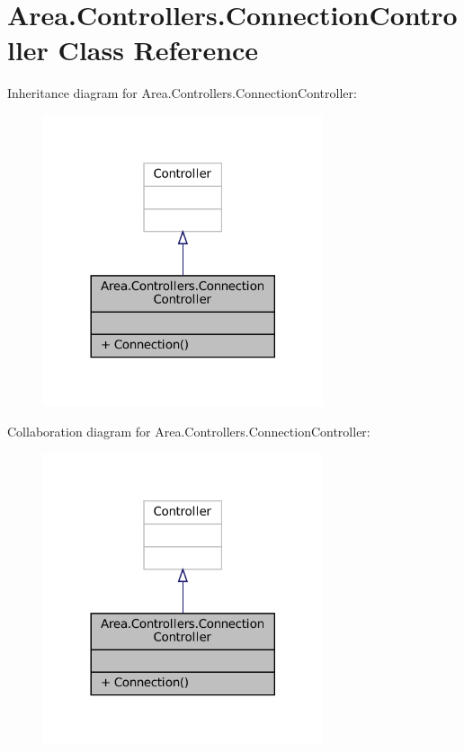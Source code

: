 \hypertarget{classArea_1_1Controllers_1_1ConnectionController}{}\section{Area.\+Controllers.\+Connection\+Controller Class Reference}
\label{classArea_1_1Controllers_1_1ConnectionController}


Inheritance diagram for Area.\+Controllers.\+Connection\+Controller\+:
\nopagebreak
\begin{figure}[H]
\begin{center}
\leavevmode
\includegraphics[width=233pt]{classArea_1_1Controllers_1_1ConnectionController__inherit__graph}
\end{center}
\end{figure}


Collaboration diagram for Area.\+Controllers.\+Connection\+Controller\+:
\nopagebreak
\begin{figure}[H]
\begin{center}
\leavevmode
\includegraphics[width=233pt]{classArea_1_1Controllers_1_1ConnectionController__coll__graph}
\end{center}
\end{figure}
